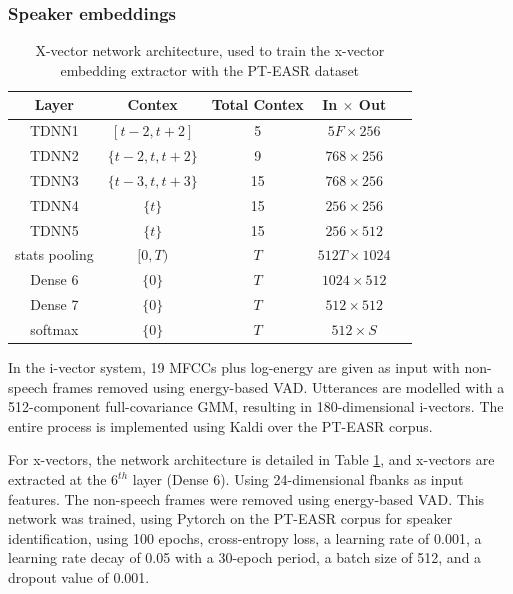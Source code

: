 \subsubsection{Speaker embeddings}
\begin{table}[h]
  \centering
  \begin{tabular}{ccccc}
  \hline
  Layer & Contex & Total Contex & In $\times$ Out \\
  \hline
  TDNN1 & $[t-2, t+2]$ & 5 & $5F \times 256$ & \\
  TDNN2 & $\{t-2, t, t+2\}$ & 9 & $768 \times 256$ & \\
  TDNN3 & $\{t-3, t, t+3\}$ & 15 & $768 \times 256$ & \\
  TDNN4 & $\{t\}$ & 15 & $256 \times 256$ & \\
  TDNN5 & $\{t\}$ & 15 & $256 \times 512$ & \\
  stats pooling & $[0, T)$ & $T$ & $512T \times 1024$ & \\
  Dense 6 & $\{0\}$ & $T$ & $1024 \times 512$ & \\
  Dense 7 & $\{0\}$ & $T$ & $512 \times 512$ & \\
  softmax & $\{0\}$ & $T$ & $512 \times S$ & \\
  \hline
  \end{tabular}
  \caption{X-vector network architecture, used to train the x-vector embedding extractor with the PT-EASR dataset}
  \label{tab:xvect_description}
  \end{table}
  In the i-vector system, 19 \acp{MFCC} plus log-energy are given as input with non-speech frames removed using energy-based \ac{VAD}. Utterances are modelled with a 512-component full-covariance \ac{GMM}, resulting in 180-dimensional i-vectors. The entire process is implemented using Kaldi \cite{kaldi} over the PT-EASR corpus.

  For x-vectors, the network architecture is detailed in Table \ref{tab:xvect_description}, and x-vectors are extracted at the $6^{th}$ layer (Dense 6). Using 24-dimensional \ac{fbanks} as input features. The non-speech frames were removed using energy-based \ac{VAD}. This network was trained, using Pytorch \cite{paszke2019pytorch}on the PT-EASR corpus for speaker identification, using 100 epochs, cross-entropy loss, a learning rate of 0.001, a learning rate decay of 0.05 with a 30-epoch period, a batch size of 512, and a dropout value of 0.001.

